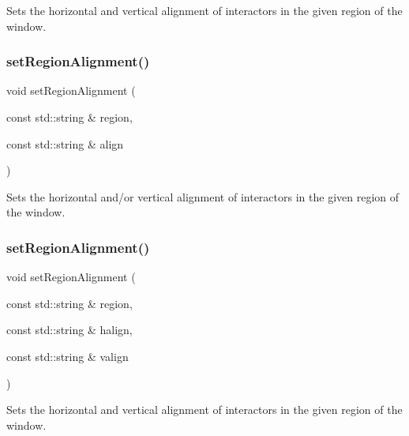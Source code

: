 Sets the horizontal and vertical alignment of interactors in the given region of the window. 

\mbox{\label{classGWindow_ae4ff46516be9472498c0bf058b496e8b}} 
\subsubsection{\texorpdfstring{set\+Region\+Alignment()}{setRegionAlignment()}\hspace{0.1cm}{\footnotesize\ttfamily [4/5]}}
{\footnotesize\ttfamily void set\+Region\+Alignment (\begin{DoxyParamCaption}\item[{const std\+::string \&}]{region,  }\item[{const std\+::string \&}]{align }\end{DoxyParamCaption})\hspace{0.3cm}{\ttfamily [virtual]}}



Sets the horizontal and/or vertical alignment of interactors in the given region of the window. 

\mbox{\label{classGWindow_ad1c76be81b3b865f78b0e91f0e1f07d4}} 
\subsubsection{\texorpdfstring{set\+Region\+Alignment()}{setRegionAlignment()}\hspace{0.1cm}{\footnotesize\ttfamily [5/5]}}
{\footnotesize\ttfamily void set\+Region\+Alignment (\begin{DoxyParamCaption}\item[{const std\+::string \&}]{region,  }\item[{const std\+::string \&}]{halign,  }\item[{const std\+::string \&}]{valign }\end{DoxyParamCaption})\hspace{0.3cm}{\ttfamily [virtual]}}



Sets the horizontal and vertical alignment of interactors in the given region of the window. 

